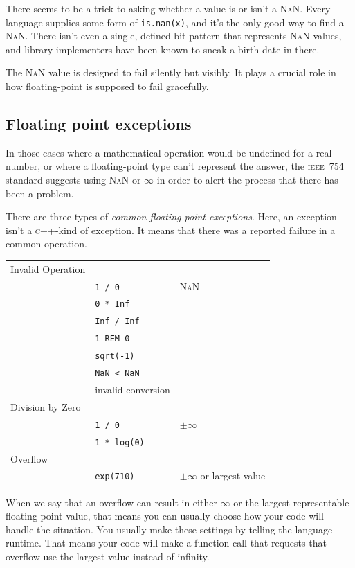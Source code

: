 \documentclass[fleqn,10pt]{olplainarticle}
\newcommand{\cpp}{\textsc{c}++\xspace}
\newcommand{\nan}{\textsc{NaN}\xspace}
\newcommand{\ieee}{\textsc{ieee}\xspace}
\begin{document}
There seems to be a trick to asking whether a value is
or isn't a \nan. Every language supplies some form of \lstinline|is.nan(x)|,
and it's the only good way to find a \nan. There isn't even a single,
defined bit pattern that represents \nan values, and library implementers
have been known to sneak a birth date in there.

The \nan value is designed to fail silently but visibly. It plays
a crucial role in how floating-point is supposed to fail gracefully.


\subsection{Floating point exceptions}

In those cases where a mathematical operation would be undefined
for a real number, or where a floating-point type can't represent
the answer, the \ieee~754 standard suggests using \nan or $\infty$ in order
to alert the process that there has been a problem.

There are three types of \emph{common floating-point exceptions}.
Here, an exception isn't a \cpp{}-kind of exception. It means that
there was a reported failure in a common operation.

\begin{tabular}{lll}
Invalid Operation & & \\
 & \lstinline|1 / 0| & \nan \\
 & \lstinline|0 * Inf| & \\
 & \lstinline|Inf / Inf| & \\
 & \lstinline|1 REM 0| & \\
 & \lstinline|sqrt(-1)| & \\
 & \lstinline|NaN < NaN| & \\
 & invalid conversion & \\
Division by Zero & & \\
 & \lstinline|1 / 0| & $\pm\infty$ \\
 & \lstinline|1 * log(0)| & \\
Overflow & & \\
 & \lstinline|exp(710)| & $\pm\infty$ or largest value\\
\end{tabular}

When we say that an overflow can result in either $\infty$ or
the largest-representable floating-point value, that means you can
usually choose how your code will handle the situation. You usually
make these settings by telling the language runtime. That means your
code will make a function call that requests that overflow use the
largest value instead of infinity.
\end{document}
